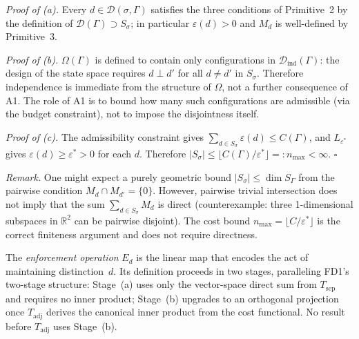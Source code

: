 \documentclass[11pt]{article}
\theoremstyle{remark}
\begin{document}
\begin{tcolorbox}[defbox, title={$\mathrm{FD4}$ (State Space and Enforcement Cost)}]
\textit{Proof of (a).}  Every $d \in \mathcal{D}(\sigma,\Gamma)$ satisfies the three conditions of Primitive~2 by the definition of $\mathcal{D}(\Gamma) \supset S_\sigma$; in particular $\varepsilon(d) > 0$ and $M_d$ is well-defined by Primitive~3.

\textit{Proof of (b).}  $\Omega(\Gamma)$ is defined to contain only configurations in $\mathcal{D}_{\mathrm{ind}}(\Gamma)$: the design of the state space requires $d \perp d'$ for all $d \ne d'$ in $S_\sigma$.  Therefore independence is immediate from the structure of $\Omega$, not a further consequence of A1.  The role of A1 is to bound how many such configurations are admissible (via the budget constraint), not to impose the disjointness itself.

\textit{Proof of (c).}  The admissibility constraint gives $\sum_{d \in S_\sigma} \varepsilon(d) \le C(\Gamma)$, and $L_{\varepsilon^*}$ gives $\varepsilon(d) \ge \varepsilon^* > 0$ for each $d$.  Therefore $|S_\sigma| \le \lfloor C(\Gamma)/\varepsilon^*\rfloor =: n_{\max} < \infty$.  \hfill$\square$

\noindent\textit{Remark.}  One might expect a purely geometric bound $|S_\sigma| \le \dim S_\Gamma$ from the pairwise condition $M_d \cap M_{d'} = \{0\}$.  However, pairwise trivial intersection does not imply that the sum $\sum_{d \in S_\sigma} M_d$ is direct (counterexample: three 1-dimensional subspaces in $\mathbb{R}^2$ can be pairwise disjoint).  The cost bound $n_{\max} = \lfloor C/\varepsilon^*\rfloor$ is the correct finiteness argument and does not require directness.

\end{tcolorbox}

The \emph{enforcement operation} $E_d$ is the linear map that encodes the act of maintaining distinction~$d$.  Its definition proceeds in two stages, paralleling FD1's two-stage structure: Stage~(a) uses only the vector-space direct sum from $T_{\mathrm{sep}}$ and requires no inner product; Stage~(b) upgrades to an orthogonal projection once $T_{\mathrm{adj}}$ derives the canonical inner product from the cost functional.  No result before $T_{\mathrm{adj}}$ uses Stage~(b).
\end{document}

